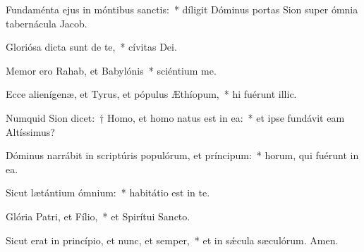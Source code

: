 \item Fundaménta ejus in móntibus sanctis:~* díligit Dóminus portas Sion super ómnia tabernácula Jacob.

\item Gloriósa dicta sunt de te,~* cívitas Dei.

\item Memor ero Rahab, et Babylónis~* sciéntium me.

\item Ecce alienígenæ, et Tyrus, et pópulus Æthíopum,~* hi fuérunt illic.

\item Numquid Sion dicet:~† Homo, et homo natus est in ea:~* et ipse fundávit eam Altíssimus?

\item Dóminus narrábit in scriptúris populórum, et príncipum:~* horum, qui fuérunt in ea.

\item Sicut lætántium ómnium:~* habitátio est in te.

\item Glória Patri, et Fílio,~* et Spirítui Sancto.

\item Sicut erat in princípio, et nunc, et semper,~* et in sǽcula sæculórum. Amen.

